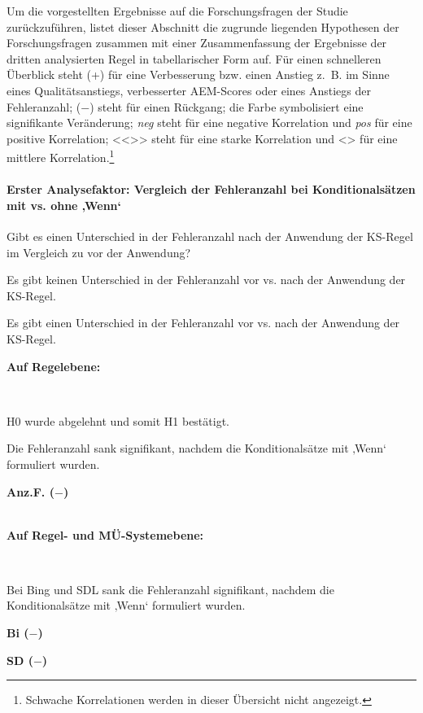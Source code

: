 Um die vorgestellten Ergebnisse auf die Forschungsfragen der Studie zurückzuführen, listet dieser Abschnitt die zugrunde liegenden Hypothesen der Forschungsfragen zusammen mit einer Zusammenfassung der Ergebnisse der dritten analysierten Regel in tabellarischer Form auf. Für einen schnelleren Überblick steht (+) für eine Verbesserung bzw. einen Anstieg z.~B. im Sinne eines Qualitätsanstiegs, verbesserter AEM-Scores oder eines Anstiegs der Fehleranzahl; ($-$) steht für einen Rückgang; die  Farbe symbolisiert eine signifikante Veränderung; \textit{neg} steht für eine negative Korrelation und \textit{pos} für eine positive Korrelation; <{}<{}>{}> steht für eine starke Korrelation und <> für eine mittlere Korrelation.\footnote{\textrm{Schwache Korrelationen werden in dieser Übersicht nicht angezeigt.}}

\paragraph*{Erster Analysefaktor: Vergleich der Fehleranzahl bei Konditionalsätzen mit vs. ohne ‚Wenn‘}
\begin{description}[font=\normalfont\bfseries]
\item [Fragestellung:] Gibt es einen Unterschied in der Fehleranzahl nach der Anwendung der KS-Regel im Vergleich zu vor der Anwendung?
\item [H0 --] Es gibt keinen Unterschied in der Fehleranzahl vor vs. nach der Anwendung der KS-Regel.
\item [H1 --] Es gibt einen Unterschied in der Fehleranzahl vor vs. nach der Anwendung der KS-Regel.
\item [Resultat]
\end{description}
\noindent
\parbox[t]{.8\textwidth}{\textbf{Auf Regelebene:}}\\
\noindent
\parbox[t]{.8\textwidth}{
H0 wurde abgelehnt und somit H1 bestätigt.

Die Fehleranzahl sank signifikant, nachdem die Konditionalsätze mit ‚Wenn‘ formuliert wurden.}
\parbox[t]{.04\textwidth}{}
\colorbox{smGreen}{\parbox[t]{.15\textwidth}{\textbf{Anz.F. ($-$)}\\
\\
}}

\medskip
\noindent
\parbox[t]{.8\textwidth}{\textbf{Auf Regel- und MÜ-Systemebene:}}\\
\noindent
\parbox[t]{.8\textwidth}{
Bei Bing und SDL sank die Fehleranzahl signifikant, nachdem die Konditionalsätze mit ‚Wenn‘ formuliert wurden.}
\parbox[t]{.04\textwidth}{}
\colorbox{smGreen}{\parbox[t]{.15\textwidth}{{ \textbf{Bi ($-$)}}

{ \textbf{SD ($-$)}}}}

